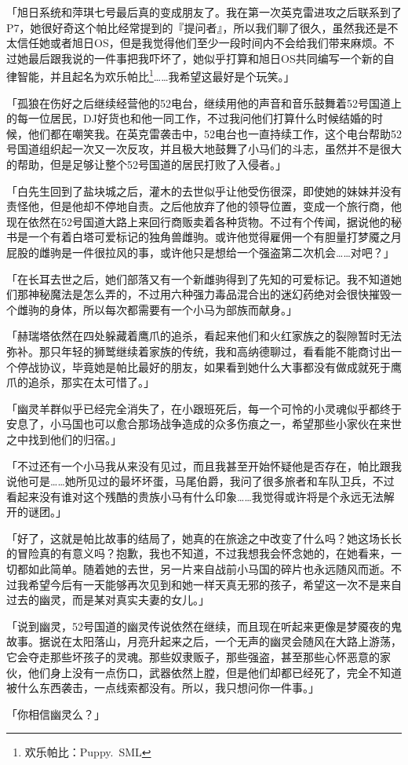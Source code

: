 {「旭日系统和萍琪七号最后真的变成朋友了。我在第一次英克雷进攻之后联系到了P7，她很好奇这个帕比经常提到的『提问者』，所以我们聊了很久，虽然我还是不太信任她或者旭日OS，但是我觉得他们至少一段时间内不会给我们带来麻烦。不过她最后跟我说的一件事把我吓坏了，她似乎打算和旭日OS共同编写一个新的自律智能，并且起名为欢乐帕比\footnote{欢乐帕比：Puppy.~SML}……我希望这最好是个玩笑。」

「孤狼在伤好之后继续经营他的52电台，继续用他的声音和音乐鼓舞着52号国道上的每一位居民，DJ好货也和他一同工作，不过我问他们打算什么时候结婚的时候，他们都在嘲笑我。在英克雷袭击中，52电台也一直持续工作，这个电台帮助52号国道组织起一次又一次反攻，并且极大地鼓舞了小马们的斗志，虽然并不是很大的帮助，但是足够让整个52号国道的居民打败了入侵者。」

「白先生回到了盐块城之后，灌木的去世似乎让他受伤很深，即使她的妹妹并没有责怪他，但是他却不停地自责。之后他放弃了他的领导位置，变成一个旅行商，他现在依然在52号国道大路上来回行商贩卖着各种货物。不过有个传闻，据说他的秘书是一个有着白塔可爱标记的独角兽雌驹。或许他觉得雇佣一个有胆量打梦魇之月屁股的雌驹是一件很拉风的事，或许他只是想给一个强盗第二次机会……对吧？」

「在长耳去世之后，她们部落又有一个新雌驹得到了先知的可爱标记。我不知道她们那神秘魔法是怎么弄的，不过用六种强力毒品混合出的迷幻药绝对会很快摧毁一个雌驹的身体，所以每次都需要有一个小马为部族而献身。」

「赫瑞塔依然在四处躲藏着鹰爪的追杀，看起来他们和火红家族之的裂隙暂时无法弥补。那只年轻的狮鹫继续着家族的传统，我和高纳德聊过，看看能不能商讨出一个停战协议，毕竟她是帕比最好的朋友，如果看到她什么大事都没有做成就死于鹰爪的追杀，那实在太可惜了。」

「幽灵羊群似乎已经完全消失了，在小跟班死后，每一个可怜的小灵魂似乎都终于安息了，小马国也可以愈合那场战争造成的众多伤痕之一，希望那些小家伙在来世之中找到他们的归宿。」

「不过还有一个小马我从来没有见过，而且我甚至开始怀疑他是否存在，帕比跟我说他可是……她所见过的最坏坏蛋，马尾伯爵，我问了很多旅者和车队卫兵，不过看起来没有谁对这个残酷的贵族小马有什么印象……我觉得或许将是个永远无法解开的谜团。」

「好了，这就是帕比故事的结局了，她真的在旅途之中改变了什么吗？她这场长长的冒险真的有意义吗？抱歉，我也不知道，不过我想我会怀念她的，在她看来，一切都如此简单。随着她的去世，另一片来自战前小马国的碎片也永远随风而逝。不过我希望今后有一天能够再次见到和她一样天真无邪的孩子，希望这一次不是来自过去的幽灵，而是某对真实夫妻的女儿。」

「说到幽灵，52号国道的幽灵传说依然在继续，而且现在听起来更像是梦魇夜的鬼故事。据说在太阳落山，月亮升起来之后，一个无声的幽灵会随风在大路上游荡，它会夺走那些坏孩子的灵魂。那些奴隶贩子，那些强盗，甚至那些心怀恶意的家伙，他们身上没有一点伤口，武器依然上膛，但是他们却都已经死了，完全不知道被什么东西袭击，一点线索都没有。所以，我只想问你一件事。」

「你相信幽灵么？」

}

